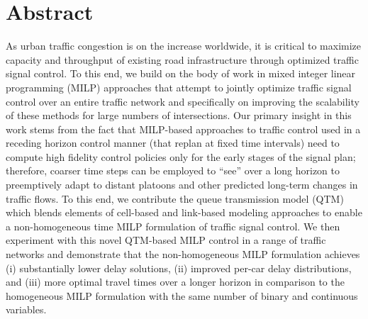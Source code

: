 \section*{Abstract}



As urban traffic congestion is on the increase worldwide, it is
critical to maximize capacity and throughput of existing road
infrastructure through optimized traffic signal control.  To this end,
we build on the body of work in mixed integer linear programming
(MILP) approaches that attempt to jointly optimize traffic signal
control over an entire traffic network and specifically on
improving the scalability of these methods for large numbers of
intersections.  Our primary insight in this work stems from the fact
that MILP-based approaches to traffic control used in a receding
horizon control manner (that replan at fixed time intervals) need to
compute high fidelity control policies only for the early stages of
the signal plan; therefore, coarser time steps can be employed to
``see'' over a long horizon to preemptively adapt to distant platoons
and other predicted long-term changes in traffic flows.  To this end,
we contribute the queue transmission model (QTM) which blends elements
of cell-based and link-based modeling approaches to enable a
non-homogeneous time MILP formulation of traffic signal control.
%
We then experiment with this novel QTM-based MILP control in a range
of traffic networks and demonstrate that the non-homogeneous MILP
formulation achieves (i) substantially lower delay solutions, (ii)
improved per-car delay distributions, and (iii) more optimal travel
times over a longer horizon in comparison to the homogeneous MILP
formulation with the same number of binary and continuous variables.

%
%
%

%


%
